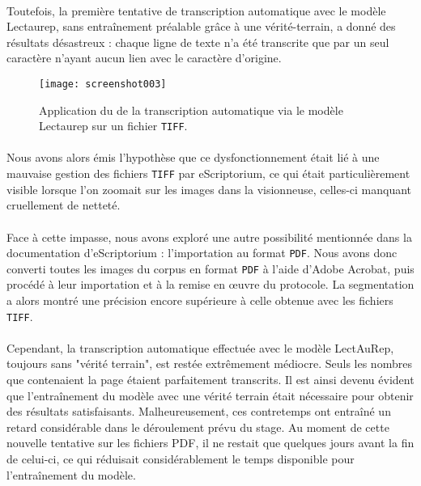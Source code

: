 \documentclass[a4paper,12pt,twoside]{book}
\begin{document}
\paragraph{}
Toutefois, la première tentative de transcription automatique avec le modèle Lectaurep, sans entraînement préalable grâce à une vérité-terrain, a donné des résultats désastreux : chaque ligne de texte n’a été transcrite que par un seul caractère n'ayant aucun lien avec le caractère d'origine. 

\begin{figure}[H]
	\centering
	\texttt{[image: screenshot003]}
	\caption{Application du de la transcription automatique via le modèle Lectaurep sur un fichier \texttt{TIFF}.}
	\label{fig:screenshot003}
\end{figure}

\paragraph{}
Nous avons alors émis l’hypothèse que ce dysfonctionnement était lié à une mauvaise gestion des fichiers \texttt{TIFF} par eScriptorium, ce qui était particulièrement visible lorsque l’on zoomait sur les images dans la visionneuse, celles-ci manquant cruellement de netteté.

\paragraph{}
Face à cette impasse, nous avons exploré une autre possibilité mentionnée dans la documentation d’eScriptorium : l’importation au format \texttt{PDF}. Nous avons donc converti toutes les images du corpus en format \texttt{PDF} à l’aide d’Adobe Acrobat, puis procédé à leur importation et à la remise en œuvre du protocole. La segmentation a alors montré une précision encore supérieure à celle obtenue avec les fichiers \texttt{TIFF}. 

\paragraph{}
Cependant, la transcription automatique effectuée avec le modèle LectAuRep, toujours sans "vérité terrain", est restée extrêmement médiocre. Seuls les nombres que contenaient la page étaient parfaitement transcrits. Il est ainsi devenu évident que l’entraînement du modèle avec une vérité terrain était nécessaire pour obtenir des résultats satisfaisants. Malheureusement, ces contretemps ont entraîné un retard considérable dans le déroulement prévu du stage. Au moment de cette nouvelle tentative sur les fichiers PDF, il ne restait que quelques jours avant la fin de celui-ci, ce qui réduisait considérablement le temps disponible pour l'entraînement du modèle.
\end{document}
